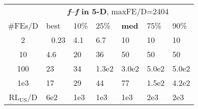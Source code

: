 \begin{tabular}{c|llllll}
 & \multicolumn{6}{|c}{\textbf{\textit{f}\raisebox{-0.35ex}{1}--\textit{f}\raisebox{-0.35ex}{24} in 5-D}, maxFE/D=2404}\\
\#FEs/D & best & 10\% & 25\% & \textbf{med} & 75\% & 90\%\\
2 & ~\,0.23 & \hspace*{1ex}4.1 & \hspace*{1ex}6.7 & 10 & 10 & 10\\
10 & \hspace*{1ex}4.6 & 20 & 36 & 50 & 50 & 50\\
100 & 23 & 34 & 1.3e2 & 3.0e2 & 5.0e2 & 5.0e2\\
1e3 & 17 & 29 & 44 & 77 & 1.5e2 & 4.2e2\\
$\text{RL}_{\text{US}}$/D & 6e2 & 1e3 & 1e3 & 1e3 & 2e3 & 2e3
\end{tabular}
